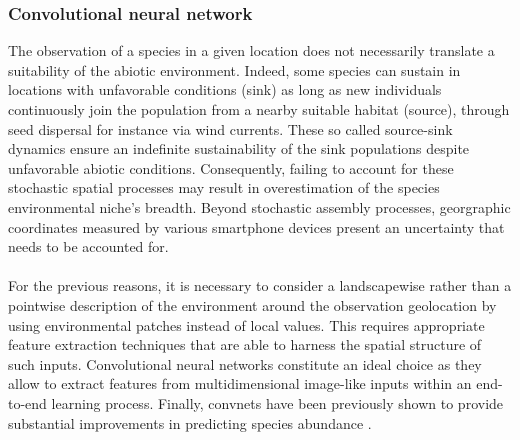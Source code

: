 \documentclass[]{article}
\begin{document}
\subsubsection{Convolutional neural network}
The observation of a species in a given location does not necessarily translate a suitability of the abiotic environment. Indeed, some species can sustain in locations with unfavorable conditions (sink) as long as new individuals continuously join the population from a nearby suitable habitat (source), through seed dispersal for instance via wind currents. These so called source-sink dynamics \cite{holt1985population} ensure an indefinite sustainability of the sink populations despite unfavorable abiotic conditions. %
Consequently, failing to account for these stochastic spatial processes may result in overestimation of the species environmental niche's breadth.
Beyond stochastic assembly processes, georgraphic coordinates measured by various smartphone devices present an uncertainty that needs to be accounted for.\\\\
\noindent For the previous reasons, it is necessary to consider a landscapewise rather than a pointwise description of the environment around the observation geolocation by using environmental patches instead of local values. This requires appropriate feature extraction techniques that are able to harness the spatial structure of such inputs. Convolutional neural networks\cite{lecun1995convolutional} constitute an ideal choice as they allow to extract features from multidimensional image-like inputs within an end-to-end learning process. Finally, convnets have been previously shown to provide substantial improvements in predicting species abundance \cite{botella2018deep,deneu2018location}.\\
\end{document}
